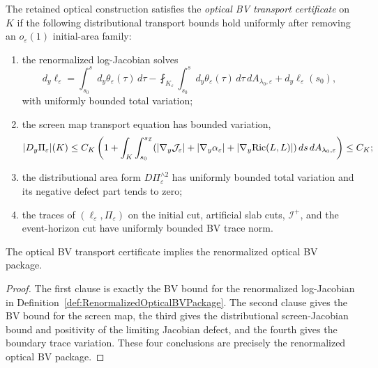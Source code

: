 \begin{definition}\label{def:OpticalBVTransportCertificate}
The retained optical construction satisfies the \emph{optical BV transport certificate} on $K$ if the following distributional transport bounds hold uniformly after removing an $o_\varepsilon(1)$ initial-area family:
\begin{enumerate}
    \item the renormalized log-Jacobian solves
    \[
        d_y\ell_\varepsilon
        =
        \int_{s_0}^{s}
        d_y\theta_\varepsilon(\tau)\,d\tau
        -
        \fint_{K_\varepsilon}
        \int_{s_0}^{s}d_y\theta_\varepsilon(\tau)\,d\tau\,dA_{\lambda_0,\varepsilon}
        +
        d_y\ell_\varepsilon(s_0),
    \]
    with uniformly bounded total variation;
    \item the screen map transport equation has bounded variation,
    \[
        |D_y\Pi_\varepsilon|(K)
        \le
        C_K\left(1+\int_K\int_{s_0}^{s_{\mathcal{I}}}
        (|\nabla_y\mathcal J_\varepsilon|+|\nabla_y\alpha_\varepsilon|+|\nabla_y\mathrm{Ric}(L,L)|)\,ds\,dA_{\lambda_0,\varepsilon}\right)
        \le C_K;
    \]
    \item the distributional area form $D\Pi_\varepsilon^{\wedge2}$ has uniformly bounded total variation and its negative defect part tends to zero;
    \item the traces of $(\ell_\varepsilon,\Pi_\varepsilon)$ on the initial cut, artificial slab cuts, $\mathscr I^+$, and the event-horizon cut have uniformly bounded BV trace norm.
\end{enumerate}
\end{definition}

\begin{proposition}\label{prop:BVTransportCertificateGate}
The optical BV transport certificate implies the renormalized optical BV package.
\end{proposition}

\begin{proof}
The first clause is exactly the BV bound for the renormalized log-Jacobian in Definition~\ref{def:RenormalizedOpticalBVPackage}. The second clause gives the BV bound for the screen map, the third gives the distributional screen-Jacobian bound and positivity of the limiting Jacobian defect, and the fourth gives the boundary trace variation. These four conclusions are precisely the renormalized optical BV package.
\end{proof}

